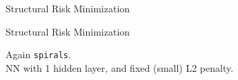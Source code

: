 \documentclass[11pt,compress,t,notes=noshow, xcolor=table]{beamer}
\begin{document}
\begin{vbframe} {Structural Risk Minimization}
\end{vbframe}

\begin{frame} {Structural Risk Minimization}

\small

Again \texttt{spirals}.\\
NN with 1 hidden layer, and fixed (small) L2 penalty. 

\vfill


\end{frame}
\end{document}
